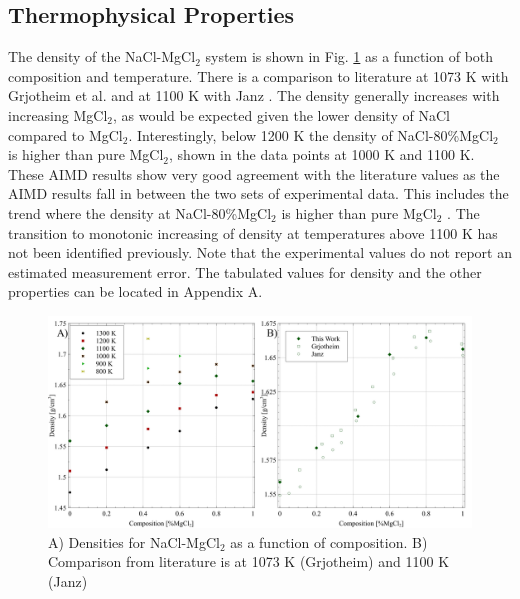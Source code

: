 \documentclass[review]{elsarticle}
\begin{document}





\subsection{Thermophysical Properties}
The density of the NaCl-MgCl$_2$ system is shown in Fig. \ref{fig:density} as a function of both composition and temperature. There is a comparison to literature at 1073 K with Grjotheim et al. \cite{grjotheim1971} and at 1100 K with Janz \cite{Janz1988}. The density generally increases with increasing MgCl$_2$, as would be expected given the lower density of NaCl compared to MgCl$_2$. Interestingly, below 1200 K the density of NaCl-80\%MgCl$_2$ is higher than pure MgCl$_2$, shown in the data points at 1000 K and 1100 K. These AIMD results show very good agreement with the literature values as the AIMD results fall in between the two sets of experimental data. This includes the trend where the density at NaCl-80\%MgCl$_2$ is higher than pure MgCl$_2$ \cite{grjotheim1971}. The transition to monotonic increasing of density at temperatures above 1100 K has not been identified previously. Note that the experimental values do not report an estimated measurement error. The tabulated values for density and the other properties can be located in Appendix A.
\begin{figure}[h]
 \centering
 \includegraphics[width=1.0\textwidth]{images/density_combined_figures.jpg} 
 \caption{A) Densities for NaCl-MgCl$_2$ as a function of composition. B) Comparison from literature is at 1073 K (Grjotheim) \cite{grjotheim1971} and 1100 K (Janz) \cite{Janz1988}}
 \label{fig:density}
\end{figure} 
\end{document}
